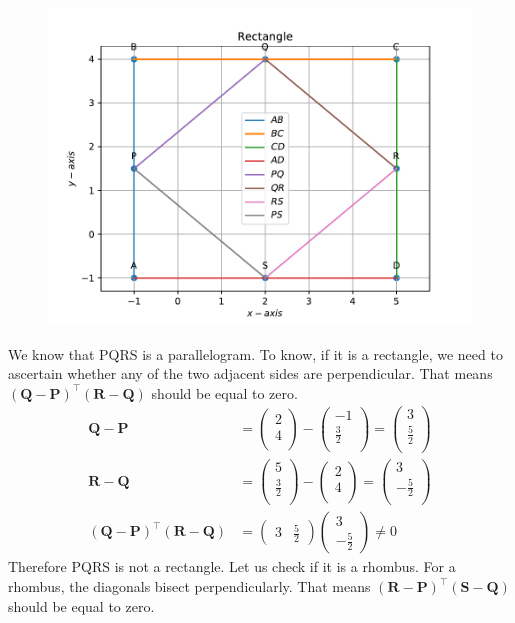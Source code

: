 \documentclass[12pt]{article}
\providecommand{\brak}[1]{\ensuremath{\left(#1\right)}}
\newcommand{\myvec}[1]{\ensuremath{\begin{pmatrix}#1\end{pmatrix}}}
\let\vec\mathbf
\begin{document}
\begin{enumerate}
\begin{figure}[!h]
	\begin{center}
		\includegraphics[width=\columnwidth]{chapters/10/7/4/8/figs/problem1.pdf}
	\end{center}
\caption{}
\label{fig:10/7/4/8Fig3}
\end{figure}
We know that PQRS is a parallelogram. To know, if it is a rectangle, we need to ascertain whether any of the two adjacent sides are perpendicular. 
That means $\brak{\vec{Q}-\vec{P}}^\top\brak{\vec{R}-\vec{Q}}$ should be equal to zero. 
\begin{align}
\vec{Q}-\vec{P} &=  \myvec{
 2 \\
 4 \\
 } - \myvec{
 -1 \\
 \frac{3}{2} \\
 } = \myvec{
 3 \\
 \frac{5}{2} \\ 
 } \\
 \vec{R}-\vec{Q} &=  \myvec{
 5 \\
 \frac{3}{2}\\
 } - \myvec{
 2 \\
 4 \\
 } = \myvec{
 3 \\
 -\frac{5}{2} \\ 
 } \\ 
 \brak{\vec{Q}-\vec{P}}^\top\brak{\vec{R}-\vec{Q}} &= \myvec{
 3 & \frac{5}{2}} \myvec{
 3 \\
 -\frac{5}{2} 
 } \neq 0
\end{align}
Therefore PQRS is not a rectangle. Let us check if it is a rhombus. For a rhombus, the diagonals bisect perpendicularly. That means $\brak{\vec{R}-\vec{P}}^\top\brak{\vec{S}-\vec{Q}}$ should be equal to zero. 

\end{enumerate}
\end{document}
